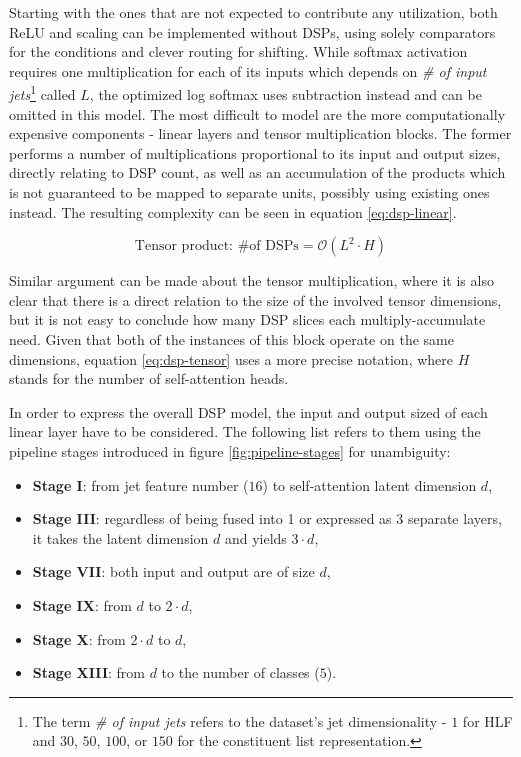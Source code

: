 Starting with the ones that are not expected to contribute any utilization, both ReLU and scaling can be implemented without DSPs, using solely comparators for the conditions and clever routing for shifting. While softmax activation requires one multiplication for each of its inputs which depends on \textit{\# of input jets}\footnote{The term \textit{\# of input jets} refers to the dataset's jet dimensionality - \(1\) for HLF and \(30\), \(50\), \(100\), or \(150\) for the constituent list representation.} called \(L\), the optimized log softmax uses subtraction instead and can be omitted in this model. The most difficult to model are the more computationally expensive components - linear layers and tensor multiplication blocks. The former performs a number of multiplications proportional to its input and output sizes, directly relating to DSP count, as well as an accumulation of the products which is not guaranteed to be mapped to separate units, possibly using existing ones instead. The resulting complexity can be seen in equation \ref{eq:dsp-linear}.

\begin{equation} \label{eq:dsp-tensor}
  \text{Tensor product: \# of DSPs} = \mathcal{O}( L^2 \cdot H )
\end{equation}

Similar argument can be made about the tensor multiplication, where it is also clear that there is a direct relation to the size of the involved tensor dimensions, but it is not easy to conclude how many DSP slices each multiply-accumulate need. Given that both of the instances of this block operate on the same dimensions, equation \ref{eq:dsp-tensor} uses a more precise notation, where \(H\) stands for the number of self-attention heads.

In order to express the overall DSP model, the input and output sized of each linear layer have to be considered. The following list refers to them using the pipeline stages introduced in figure \ref{fig:pipeline-stages} for unambiguity:

\begin{itemize}
  \item \textbf{Stage I}: from jet feature number (\(16\)) to self-attention latent dimension \(d\),
  \item \textbf{Stage III}: regardless of being fused into 1 or expressed as 3 separate layers, it takes the latent dimension \(d\) and yields \(3 \cdot d\),
  \item \textbf{Stage VII}: both input and output are of size \(d\),
  \item \textbf{Stage IX}: from \(d\) to \(2 \cdot d\),
  \item \textbf{Stage X}: from \(2 \cdot d\) to \(d\),
  \item \textbf{Stage XIII}: from \(d\) to the number of classes (\(5\)).
\end{itemize}

